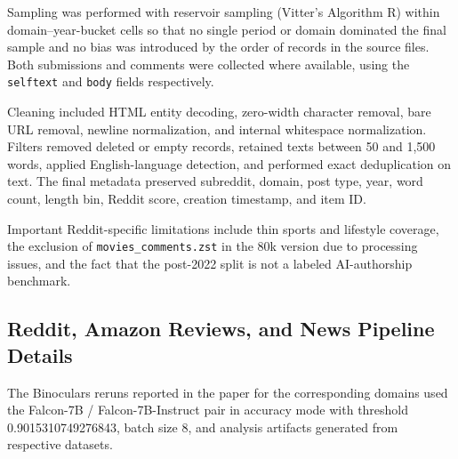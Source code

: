 \documentclass[11pt]{article}
\begin{document}
Sampling was performed with reservoir sampling (Vitter's Algorithm R) within
domain--year-bucket cells so that no single period or domain dominated the
final sample and no bias was introduced by the order of records in the source
files. Both submissions and comments were collected where available, using the
\texttt{selftext} and \texttt{body} fields respectively.

Cleaning included HTML entity decoding, zero-width character removal, bare URL
removal, newline normalization, and internal whitespace normalization. Filters
removed deleted or empty records, retained texts between 50 and 1,500 words,
applied English-language detection, and performed exact deduplication on text.
The final metadata preserved subreddit, domain, post type, year, word count,
length bin, Reddit score, creation timestamp, and item ID.

Important Reddit-specific limitations include thin sports and lifestyle
coverage, the exclusion of \texttt{movies\_comments.zst} in the 80k version due
to processing issues, and the fact that the post-2022 split is not a labeled
AI-authorship benchmark. 

\subsection{Reddit, Amazon Reviews, and News Pipeline Details}
The Binoculars reruns reported in the paper for the corresponding domains used the Falcon-7B / Falcon-7B-Instruct pair in accuracy mode with threshold
0.9015310749276843, batch size 8, and analysis artifacts generated from respective datasets.
\end{document}
